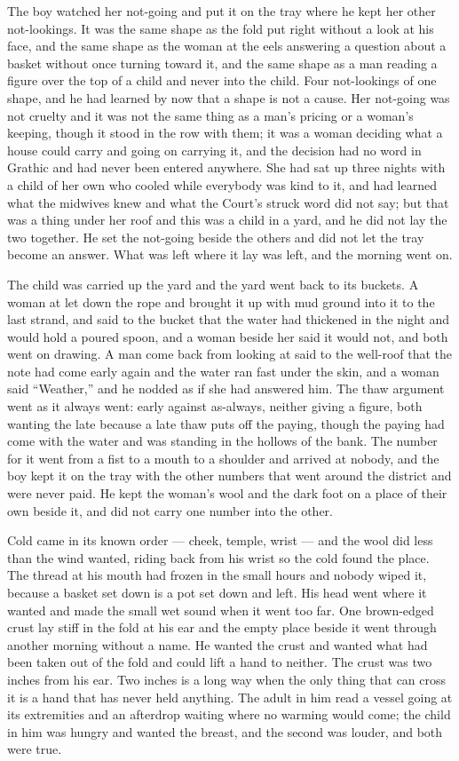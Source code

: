 The boy watched her not-going and put it on the tray where he kept her other not-lookings. It was the same shape as the fold put right without a look at his face, and the same shape as the woman at the eels answering a question about a basket without once turning toward it, and the same shape as a man reading a figure over the top of a child and never into the child. Four not-lookings of one shape, and he had learned by now that a shape is not a cause. Her not-going was not cruelty and it was not the same thing as a man's pricing or a woman's keeping, though it stood in the row with them; it was a woman deciding what a house could carry and going on carrying it, and the decision had no word in Grathic and had never been entered anywhere. She had sat up three nights with a child of her own who cooled while everybody was kind to it, and had learned what the midwives knew and what the Court's struck word did not say; but that was a thing under her roof and this was a child in a yard, and he did not lay the two together. He set the not-going beside the others and did not let the tray become an answer. What was left where it lay was left, and the morning went on.

The child was carried up the yard and the yard went back to its buckets. A woman at  let down the rope and brought it up with mud ground into it to the last strand, and said to the bucket that the water had thickened in the night and would hold a poured spoon, and a woman beside her said it would not, and both went on drawing. A man come back from looking at  said to the well-roof that the note had come early again and the water ran fast under the skin, and a woman said “Weather,” and he nodded as if she had answered him. The thaw argument went as it always went: early against as-always, neither giving a figure, both wanting the late because a late thaw puts off the paying, though the paying had come with the water and was standing in the hollows of the bank. The number for it went from a fist to a mouth to a shoulder and arrived at nobody, and the boy kept it on the tray with the other numbers that went around the district and were never paid. He kept the woman's wool and the dark foot on a place of their own beside it, and did not carry one number into the other.

Cold came in its known order — cheek, temple, wrist — and the wool did less than the wind wanted, riding back from his wrist so the cold found the place. The thread at his mouth had frozen in the small hours and nobody wiped it, because a basket set down is a pot set down and left. His head went where it wanted and made the small wet sound when it went too far. One brown-edged crust lay stiff in the fold at his ear and the empty place beside it went through another morning without a name. He wanted the crust and wanted what had been taken out of the fold and could lift a hand to neither. The crust was two inches from his ear. Two inches is a long way when the only thing that can cross it is a hand that has never held anything. The adult in him read a vessel going at its extremities and an afterdrop waiting where no warming would come; the child in him was hungry and wanted the breast, and the second was louder, and both were true.

